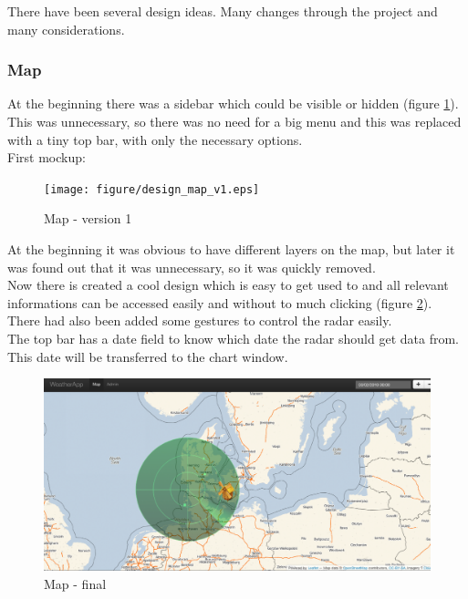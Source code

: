 There have been several design ideas. Many changes through the project and many considerations.

\subsubsection{Map}
At the beginning there was a sidebar which could be visible or hidden (figure \ref{fig:map_v1}). This was unnecessary, so there was no need for a big menu and this was replaced with a tiny top bar, with only the necessary options.\\
First mockup:
\begin{figure}[htbp]
   \centering
   \texttt{[image: figure/design\_map\_v1.eps]}
   \caption{Map - version 1}
   \label{fig:map_v1}
\end{figure}

At the beginning it was obvious to have different layers on the map, but later it was found out that it was unnecessary, so it was quickly removed.\\
Now there is created a cool design which is easy to get used to and all relevant informations can be accessed easily and without to much clicking (figure \ref{fig:map_final}).
There had also been added some gestures to control the radar easily.\\
The top bar has a date field to know which date the radar should get data from. This date will be transferred to the chart window.

\begin{figure}[htbp]
   \centering
   \includegraphics[width=1\linewidth]{figure/design_map_final.eps}
   \caption{Map - final}
   \label{fig:map_final}
\end{figure}

